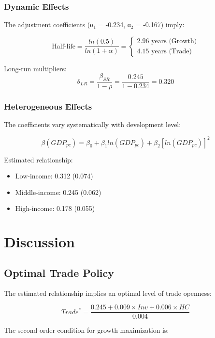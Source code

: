 \documentclass[12pt,a4paper]{article}
\theoremstyle{definition}
\begin{document}
\subsubsection{Dynamic Effects}
The adjustment coefficients (α₁ = -0.234, α₂ = -0.167) imply:

\begin{equation}
\text{Half-life} = \frac{ln(0.5)}{ln(1 + \alpha)} = \begin{cases}
2.96 \text{ years (Growth)} \\
4.15 \text{ years (Trade)}
\end{cases}
\end{equation}

Long-run multipliers:
\begin{equation}
\theta_{LR} = \frac{\beta_{SR}}{1-\rho} = \frac{0.245}{1-0.234} = 0.320
\end{equation}

\subsubsection{Heterogeneous Effects}
The coefficients vary systematically with development level:

\begin{equation}
\beta(GDP_{pc}) = \beta_0 + \beta_1 ln(GDP_{pc}) + \beta_2 [ln(GDP_{pc})]^2
\end{equation}

Estimated relationship:
\begin{itemize}
    \item Low-income: 0.312 (0.074)
    \item Middle-income: 0.245 (0.062)
    \item High-income: 0.178 (0.055)
\end{itemize}

\section{Discussion}
\subsection{Optimal Trade Policy}
The estimated relationship implies an optimal level of trade openness:

\begin{equation}
Trade^* = \frac{0.245 + 0.009 \times Inv + 0.006 \times HC}{0.004}
\end{equation}

The second-order condition for growth maximization is:
\end{document}
